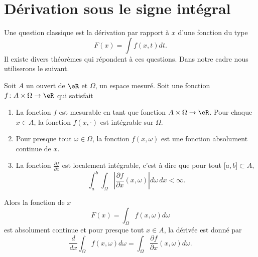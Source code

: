     

\section{Dérivation sous le signe intégral}

Une question classique est la dérivation par rapport à \( x\) d'une fonction du type
\begin{equation}
    F(x)=\int f(x,t)dt.
\end{equation}
Il existe divers théorèmes qui répondent à ces questions. Dans notre cadre nous utiliserons le suivant.
\begin{theorem}     \label{ThoDerSousIntegrale}
    Soit \( A\) un ouvert de \( \eR\) et \( \Omega\), un espace mesuré. Soit une fonction \( f\colon A\times \Omega\to \eR\) qui satisfait
    \begin{enumerate}
        \item
            La fonction \( f\) est mesurable en tant que fonction \( A\times\Omega\to \eR\). Pour chaque \( x\in A\), la fonction \( f(x,\cdot)\) est intégrable sur \( \Omega\).
        \item
            Pour presque tout \( \omega\in\Omega\), la fonction \( f(x,\omega)\) est une fonction absolument continue de \( x\).
        \item
            La fonction \( \frac{ \partial f }{ \partial x }\) est localement intégrable, c'est à dire que pour tout \( \mathopen[ a , b \mathclose]\subset A\),
            \begin{equation}
                \int_a^b\int_{\Omega}\left| \frac{ \partial f }{ \partial x }(x,\omega) \right| d\omega\,dx<\infty.
            \end{equation}
    \end{enumerate}
    Alors la fonction de \( x\)
    \begin{equation}
        F(x)=\int_{\Omega}f(x,\omega)d\omega
    \end{equation}
    est absolument continue et pour presque tout \( x\in A\), la dérivée est donné par
    \begin{equation}
        \frac{ d }{ dx }\int_{\Omega}f(x,\omega)d\omega=\int_{\Omega}\frac{ \partial f }{ \partial x }(x,\omega)d\omega.
    \end{equation}
\end{theorem}


